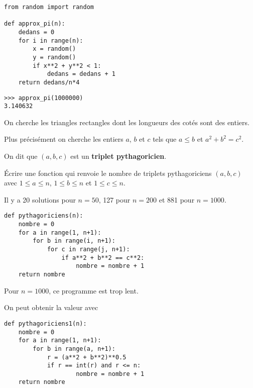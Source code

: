 \begin{Answer}
\begin{lstlisting}
from random import random

def approx_pi(n):
    dedans = 0
    for i in range(n):
        x = random()
        y = random()
        if x**2 + y**2 < 1:
            dedans = dedans + 1
    return dedans/n*4
\end{lstlisting}
\end{Answer}
\begin{lstlisting}
>>> approx_pi(1000000)
3.140632
\end{lstlisting}
\begin{Exercise}[title= Triangles rectangles]
On cherche les triangles rectangles dont les longueurs des cotés sont des entiers. 

Plus précisément on cherche les entiers $a$, $b$ et $c$ tels que $a\le b$ et $a^2+b^2=c^2$. 

On dit que $(a,b,c)$ est un {\bf triplet pythagoricien}.

Écrire une fonction  qui renvoie le nombre de triplets pythagoriciens $(a,b,c)$ avec $1\le a \le n$, $1\le b \le n$ et $1\le c \le n$.

Il y a 20 solutions pour $n=50$, 127 pour $n=200$ et 881 pour $n=1000$.
\end{Exercise}
\begin{Answer}
\begin{lstlisting}
def pythagoriciens(n):
    nombre = 0
    for a in range(1, n+1):
        for b in range(i, n+1):
            for c in range(j, n+1):
                if a**2 + b**2 == c**2:
                    nombre = nombre + 1
    return nombre
\end{lstlisting}

Pour $n=1000$, ce programme est trop lent.

On peut obtenir la valeur avec 
\begin{lstlisting}
def pythagoriciens1(n):
    nombre = 0
    for a in range(1, n+1):
        for b in range(a, n+1):
            r = (a**2 + b**2)**0.5
            if r == int(r) and r <= n:
                    nombre = nombre + 1
    return nombre
\end{lstlisting}
\newpage
\end{Answer}
